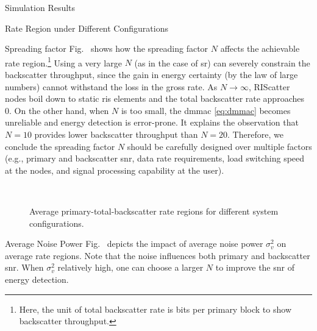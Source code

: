 \begin{section}{Simulation Results}
\begin{subsection}{Rate Region under Different Configurations}
		\begin{subsubsection}{Spreading factor}
			Fig.~ shows how the spreading factor $N$ affects the achievable rate region.\footnote{Here, the unit of total backscatter rate is bits per primary block to show backscatter throughput.}
			Using a very large $N$ (as in the case of \gls{sr}) can severely constrain the backscatter throughput, since the gain in energy certainty (by the law of large numbers) cannot withstand the loss in the gross rate.
			As $N \to \infty$, RIScatter nodes boil down to static \gls{ris} elements and the total backscatter rate approaches \num{0}.
			On the other hand, when $N$ is too small, the \gls{dmmac} \eqref{eq:dmmac} becomes unreliable and energy detection is error-prone.
			It explains the observation that $N=10$ provides lower backscatter throughput than $N=20$.
			Therefore, we conclude the spreading factor $N$ should be carefully designed over multiple factors (e.g., primary and backscatter \gls{snr}, data rate requirements, load switching speed at the nodes, and signal processing capability at the user).
		\end{subsubsection}

		\begin{figure}[H]
			\centering
			\\
			\caption{
				Average primary-total-backscatter rate regions for different system configurations.
			}
			\label{fg:region_config_2}
		\end{figure}

		\begin{subsubsection}{Average Noise Power}
			Fig.~ depicts the impact of average noise power $\sigma_v^2$ on average rate regions.
			Note that the noise influences both primary and backscatter \gls{snr}.
			When $\sigma_v^2$ relatively high, one can choose a larger $N$ to improve the \gls{snr} of energy detection.
		\end{subsubsection}


\end{subsection}
\end{section}

